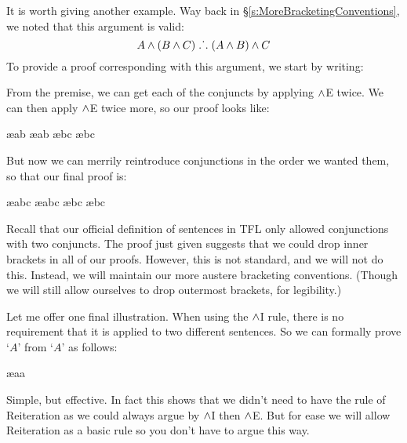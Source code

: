 It is worth giving another example. Way back in \S\ref{s:MoreBracketingConventions}, we noted that this argument is valid:
	$$A \wedge (B \wedge C) \mathrel{\ldotp\dot{}\,\ldotp} (A \wedge B) \wedge C$$
To provide a proof corresponding with this argument, we start by writing:
\begin{pf}
\end{pf}
From the premise, we can get each of the conjuncts by applying $\wedge$E twice. We can then apply $\wedge$E twice more, so our proof looks like:
\begin{pf}
	 \ae{ab}
	 \ae{ab}
	 \ae{bc}
	 \ae{bc}
\end{pf}
But now we can merrily reintroduce conjunctions in the order we wanted them, so that our final proof is:
\begin{pf}
	 \ae{abc}
	 \ae{abc}
	 \ae{bc}
	 \ae{bc}
\end{pf}
Recall that our official definition of sentences in TFL only allowed conjunctions with two conjuncts. The proof just given suggests that we could drop inner brackets in all of our proofs. However, this is not standard, and we will not do this. Instead, we will maintain our more austere bracketing conventions. (Though we will still allow ourselves to drop outermost brackets, for legibility.)

Let me offer one final illustration. When using the $\wedge$I rule, there is no requirement that it is applied to two different sentences. So we can formally prove `$A$' from `$A$' as follows:
\begin{pf}
	\ae{aa}
\end{pf}
Simple, but effective. In fact this shows that we didn't need to have the rule of Reiteration as we could always argue by $\wedge$I then $\wedge$E. But for ease we will allow Reiteration as a basic rule so you don't have to argue this way. 

